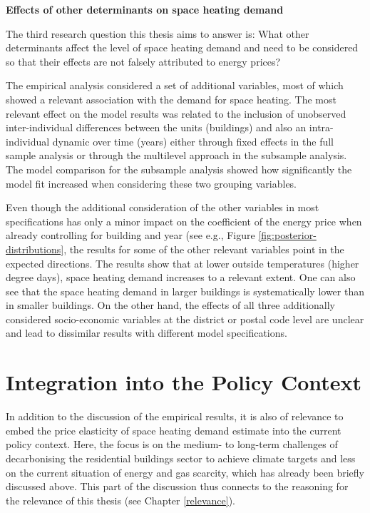 \documentclass[12pt,twoside]{reedthesis}
\begin{document}
\textbf{Effects of other determinants on space heating demand}

The third research question this thesis aims to answer is: What other determinants affect the level of space heating demand and need to be considered so that their effects are not falsely attributed to energy prices?

The empirical analysis considered a set of additional variables, most of which showed a relevant association with the demand for space heating. The most relevant effect on the model results was related to the inclusion of unobserved inter-individual differences between the units (buildings) and also an intra-individual dynamic over time (years) either through fixed effects in the full sample analysis or through the multilevel approach in the subsample analysis. The model comparison for the subsample analysis showed how significantly the model fit increased when considering these two grouping variables.

Even though the additional consideration of the other variables in most specifications has only a minor impact on the coefficient of the energy price when already controlling for building and year (see e.g., Figure \ref{fig:posterior-distributions}, the results for some of the other relevant variables point in the expected directions. The results show that at lower outside temperatures (higher degree days), space heating demand increases to a relevant extent. One can also see that the space heating demand in larger buildings is systematically lower than in smaller buildings. On the other hand, the effects of all three additionally considered socio-economic variables at the district or postal code level are unclear and lead to dissimilar results with different model specifications.

\hypertarget{policy-context}{%
\section{Integration into the Policy Context}\label{policy-context}}

In addition to the discussion of the empirical results, it is also of relevance to embed the price elasticity of space heating demand estimate into the current policy context. Here, the focus is on the medium- to long-term challenges of decarbonising the residential buildings sector to achieve climate targets and less on the current situation of energy and gas scarcity, which has already been briefly discussed above. This part of the discussion thus connects to the reasoning for the relevance of this thesis (see Chapter \ref{relevance}).
\end{document}
